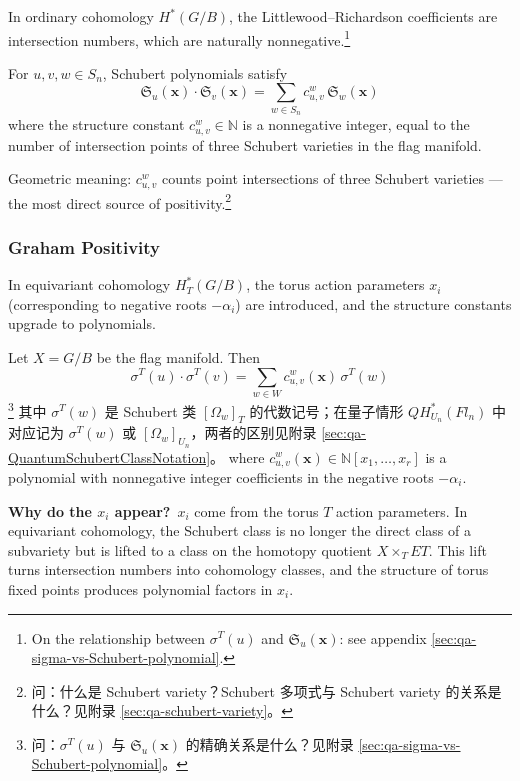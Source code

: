 In ordinary cohomology $H^*(G/B)$, the Littlewood--Richardson coefficients are intersection numbers, which are naturally nonnegative.\footnote{On the relationship between $\sigma^T(u)$ and $\mathfrak{S}_u(\mathbf{x})$: see appendix \cref{sec:qa-sigma-vs-Schubert-polynomial}.}

\begin{Theorem}
\label{th:ClassicalPositivity}
For $u, v, w \in S_n$, Schubert polynomials satisfy
$$\mathfrak{S}_u(\mathbf{x}) \cdot \mathfrak{S}_v(\mathbf{x}) = \sum_{w \in S_n} c_{u,v}^w \, \mathfrak{S}_w(\mathbf{x})$$
where the structure constant $c_{u,v}^w \in \mathbb{N}$ is a nonnegative integer, equal to the number of intersection points of three Schubert varieties in the flag manifold.
\end{Theorem}

Geometric meaning: $c_{u,v}^w$ counts point intersections of three Schubert varieties --- the most direct source of positivity.\footnote{问：什么是 Schubert variety？Schubert 多项式与 Schubert variety 的关系是什么？见附录 \cref{sec:qa-schubert-variety}。}

\subsubsection{Graham Positivity}
\label{sec:GrahamPositivityDetail}

In equivariant cohomology $H_T^*(G/B)$, the torus action parameters $x_i$ (corresponding to negative roots $-\alpha_i$) are introduced, and the structure constants upgrade to polynomials.

\begin{Theorem}
\label{th:GrahamPositivityOriginal}
Let $X = G/B$ be the flag manifold. Then
\[
\sigma^T(u) \cdot \sigma^T(v) = \sum_{w \in W} c_{u,v}^w(\mathbf{x}) \, \sigma^T(w)
\]\footnote{问：$\sigma^T(u)$ 与 $\mathfrak{S}_u(\mathbf{x})$ 的精确关系是什么？见附录 \cref{sec:qa-sigma-vs-Schubert-polynomial}。}
其中 $\sigma^T(w)$ 是 Schubert 类 $[\Omega_w]_T$ 的代数记号；在量子情形 $QH_{U_n}^*(Fl_n)$ 中对应记为 $\sigma^T(w)$ 或 $[\Omega_w]_{U_n}$，两者的区别见附录 \cref{sec:qa-QuantumSchubertClassNotation}。
where $c_{u,v}^w(\mathbf{x}) \in \mathbb{N}[x_1,\ldots,x_r]$ is a polynomial with nonnegative integer coefficients in the negative roots $-\alpha_i$.
\end{Theorem}

\textbf{Why do the $x_i$ appear?}\ $x_i$ come from the torus $T$ action parameters. In equivariant cohomology, the Schubert class is no longer the direct class of a subvariety but is lifted to a class on the homotopy quotient $X \times_T ET$. This lift turns intersection numbers into cohomology classes, and the structure of torus fixed points produces polynomial factors in $x_i$.

